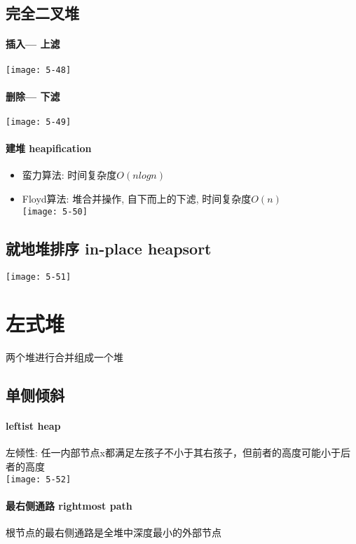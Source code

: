 \subsection{完全二叉堆}

\paragraph{插入--- 上滤}
\texttt{[image: 5-48]}

\paragraph{删除--- 下滤}
\texttt{[image: 5-49]}

\paragraph{建堆 heapification}
\begin{itemize}
\item 蛮力算法: 时间复杂度$O({nlogn})$
\item Floyd算法: 堆合并操作, 自下而上的下滤, 时间复杂度$O({n})$\\
\texttt{[image: 5-50]}
\end{itemize}

\subsection{就地堆排序 in-place heapsort}
\texttt{[image: 5-51]}

\section{左式堆}
两个堆进行合并组成一个堆

\subsection{单侧倾斜}
\paragraph{leftist heap}
左倾性: 任一内部节点x都满足左孩子不小于其右孩子，但前者的高度可能小于后者的高度\\
\texttt{[image: 5-52]}

\paragraph{最右侧通路 rightmost path}
根节点的最右侧通路是全堆中深度最小的外部节点

